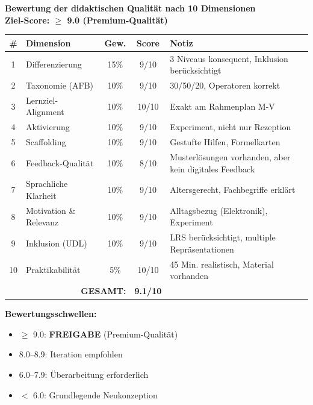 \documentclass[11pt,a4paper]{article}
\begin{document}
\begin{scorebox}
\textbf{Bewertung der didaktischen Qualität nach 10 Dimensionen}\\
\textbf{Ziel-Score: $\geq$ 9.0 (Premium-Qualität)}

\vspace{1em}
\begin{tabular}{|c|l|c|c|p{4.5cm}|}
\hline
\textbf{\#} & \textbf{Dimension} & \textbf{Gew.} & \textbf{Score} & \textbf{Notiz} \\
\hline
1 & Differenzierung & 15\% & 9/10 & 3 Niveaus konsequent, Inklusion berücksichtigt \\
\hline
2 & Taxonomie (AFB) & 10\% & 9/10 & 30/50/20, Operatoren korrekt \\
\hline
3 & Lernziel-Alignment & 10\% & 10/10 & Exakt am Rahmenplan M-V \\
\hline
4 & Aktivierung & 10\% & 9/10 & Experiment, nicht nur Rezeption \\
\hline
5 & Scaffolding & 10\% & 9/10 & Gestufte Hilfen, Formelkarten \\
\hline
6 & Feedback-Qualität & 10\% & 8/10 & Musterlösungen vorhanden, aber kein digitales Feedback \\
\hline
7 & Sprachliche Klarheit & 10\% & 9/10 & Altersgerecht, Fachbegriffe erklärt \\
\hline
8 & Motivation \& Relevanz & 10\% & 9/10 & Alltagsbezug (Elektronik), Experiment \\
\hline
9 & Inklusion (UDL) & 10\% & 9/10 & LRS berücksichtigt, multiple Repräsentationen \\
\hline
10 & Praktikabilität & 5\% & 10/10 & 45 Min. realistisch, Material vorhanden \\
\hline
\multicolumn{3}{|r|}{\textbf{GESAMT:}} & \textbf{9.1/10} & \\
\hline
\end{tabular}

\vspace{1em}
\textbf{Bewertungsschwellen:}
\begin{itemize}
    \item[\checkmark] \textcolor{successgreen}{$\geq$ 9.0: \textbf{FREIGABE} (Premium-Qualität)}
    \item[$\Box$] \textcolor{warningorange}{8.0--8.9: Iteration empfohlen}
    \item[$\Box$] 6.0--7.9: Überarbeitung erforderlich
    \item[$\Box$] $<$ 6.0: Grundlegende Neukonzeption
\end{itemize}
\end{scorebox}
\end{document}
